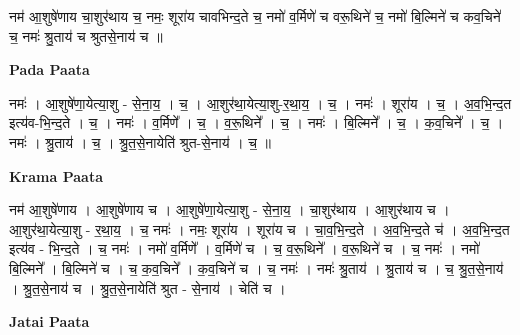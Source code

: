 \documentclass[17pt]{extarticle}
\begin{document}
नम॑ आ॒शुषे॑णाय चा॒शुर॑थाय च॒ नमः॒ शूरा॑य चावभिन्द॒ते च॒ नमो॑ व॒र्मिणे॑ च वरू॒थिने॑ च॒ नमो॑ बि॒ल्मिने॑ च कव॒चिने॑ च॒ नमः॑ श्रु॒ताय॑ च श्रुतसे॒नाय॑ च ॥ \newline

\textbf{Pada Paata} \newline

नमः॑ । आ॒शुषे॑णा॒येत्या॒शु - से॒ना॒य॒ । च॒ । आ॒शुर॑था॒येत्या॒शु-र॒था॒य॒ । च॒ । नमः॑ । शूरा॑य । च॒ । अ॒व॒भि॒न्द॒त इत्य॑व-भि॒न्द॒ते । च॒ । नमः॑ । व॒र्मिणे᳚ । च॒ । व॒रू॒थिने᳚ । च॒ । नमः॑ । बि॒ल्मिने᳚ । च॒ । क॒व॒चिने᳚ । च॒ । नमः॑ । श्रु॒ताय॑ । च॒ । श्रु॒त॒से॒नायेति॑ श्रुत-से॒नाय॑ । च॒ ॥  \newline


\textbf{Krama Paata} \newline

नम॑ आ॒शुषे॑णाय । आ॒शुषे॑णाय च । आ॒शुषे॑णा॒येत्या॒शु - से॒ना॒य॒ । चा॒शुर॑थाय । आ॒शुर॑थाय च । आ॒शुर॑था॒येत्या॒शु - र॒था॒य॒ । च॒ नमः॑ । नमः॒ शूरा॑य । शूरा॑य च । चा॒व॒भि॒न्द॒ते । अ॒व॒भि॒न्द॒ते च॑ । अ॒व॒भि॒न्द॒त इत्य॑व - भि॒न्द॒ते । च॒ नमः॑ । नमो॑ व॒र्मिणे᳚ । व॒र्मिणे॑ च । च॒ व॒रू॒थिने᳚ । व॒रू॒थिने॑ च । च॒ नमः॑ । नमो॑ बि॒ल्मिने᳚ । बि॒ल्मिने॑ च । च॒ क॒व॒चिने᳚ । क॒व॒चिने॑ च । च॒ नमः॑ । नमः॑ श्रु॒ताय॑ । श्रु॒ताय॑ च । च॒ श्रु॒त॒से॒नाय॑ । श्रु॒त॒से॒नाय॑ च । श्रु॒त॒से॒नायेति॑ श्रुत - से॒नाय॑ । चेति॑ च । \newline

\textbf{Jatai Paata} \newline
\end{document}
